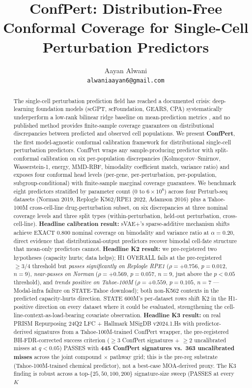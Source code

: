\documentclass{article}
\title{ConfPert: Distribution-Free Conformal Coverage for Single-Cell Perturbation Predictors}
\author{%
  Aayan Alwani \\
  \texttt{alwaniaayan6@gmail.com} \\
}
\begin{document}
\maketitle

\begin{abstract}
The single-cell perturbation prediction field has reached a documented crisis: deep-learning foundation models (scGPT, scFoundation, GEARS, CPA) systematically underperform a low-rank bilinear ridge baseline on mean-prediction metrics \citep{ahlmann2025, csendes2025}, and no published method provides finite-sample coverage guarantees on distributional discrepancies between predicted and observed cell populations. We present \textbf{ConfPert}, the first model-agnostic conformal calibration framework for distributional single-cell perturbation predictors. ConfPert wraps any sample-producing predictor with split-conformal calibration on six per-population discrepancies (Kolmogorov--Smirnov, Wasserstein-1, energy, MMD-RBF, bimodality coefficient match, variance ratio) and exposes four conformal head levels (per-gene, per-perturbation, per-population, subgroup-conditional) with finite-sample marginal coverage guarantees. We benchmark eight predictors stratified by parameter count ($0$ to $6 \times 10^8$) across four Perturb-seq datasets (Norman 2019, Replogle K562/RPE1 2022, Adamson 2016) plus a Tahoe-100M cross-cell-line drug-perturbation subset, on six discrepancies at three nominal coverage levels and three split types (within-perturbation, held-out perturbation, cross-cell-line). \textbf{Headline calibration result:} sVAE+'s sparse-additive mechanism shifts achieve EXACT $0.800$ nominal coverage on bimodality and variance ratio at $\alpha = 0.20$, direct evidence that distributional-output predictors recover bimodal cell-fate structure that mean-only predictors cannot. \textbf{Headline K2 result:} we pre-registered two hypotheses (capacity hurts; data helps); H1 OVERALL fails at the pre-registered $\geq 3/4$ threshold but \emph{passes significantly on Replogle RPE1} ($\rho = +0.756$, $p = 0.012$, $n = 9$), \emph{near-passes on Norman} ($\rho = +0.569$, $p = 0.057$, $n = 9$, just above the $p < 0.05$ threshold), and \emph{trends positive on Tahoe-100M} ($\rho = +0.559$, $p = 0.105$, $n = 7$ --- Modal-infra failure on STATE-Tahoe download); both non-K562 contexts in the predicted capacity-hurts direction. STATE 600M's per-dataset rows shift K2 in the H1-positive direction on every dataset where it could be evaluated, strengthening the cell-line-context-as-load-bearing covariate observation. \textbf{Headline K3 result:} on real PRISM Repurposing 24Q2 LFC + Hallmark MSigDB v2024.1.Hs with predictor-derived signatures from a Tahoe-100M-trained ConfPert wrapper, the pre-registered BH-FDR-corrected success criterion ($\geq 3$ ConfPert signatures + $\geq 2$ uncalibrated misses at $q < 0.05$) PASSES with \textbf{445 ConfPert signatures vs.\ 363 uncalibrated misses} across the joint compound $\times$ pathway grid; this is the pre-reg substrate (Tahoe-100M-trained chemical predictor), not a best-case MOA-derived proxy. The K3 finding is robust across a top-$\{25, 50, 100, 200\}$ signature-size sweep (PASSES at every $K$ 
\end{abstract}
\end{document}
